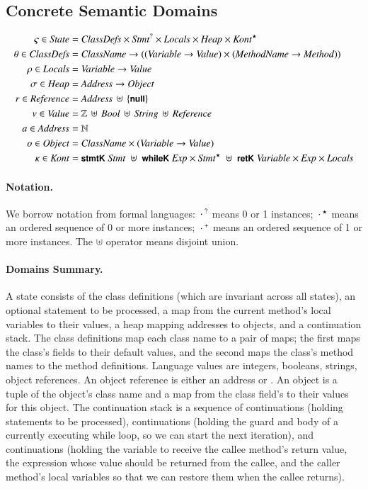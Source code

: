 \documentclass[10pt]{article}
\begin{document}
\subsection{Concrete Semantic Domains}
\label{ssec:cdomains}

\begin{align*}
  \varsigma \in \mathit{State} &= \mathit{ClassDefs} \times \mathit{Stmt}^? \times \mathit{Locals} \times
  \mathit{Heap} \times \mathit{Kont}^\star
  \\
  \theta \in \mathit{ClassDefs} &= \mathit{ClassName} \to ((\mathit{Variable} \to \mathit{Value}) \times
  (\mathit{MethodName} \to \mathit{Method}))
  \\
  \rho \in \mathit{Locals} &= \mathit{Variable} \to \mathit{Value}
  \\
  \sigma \in \mathit{Heap} &= \mathit{Address} \to \mathit{Object}
  \\
  r \in \mathit{Reference} &= \mathit{Address} \,\uplus\, \left\{\mbox{\sffamily{\bfseries\small {null}}}\right\}
  \\
  v \in \mathit{Value} &= \mathbb{Z} \,\uplus\, \mathit{Bool} \,\uplus\, \mathit{String} \,\uplus\,
  \mathit{Reference}
  \\
  a \in \mathit{Address} &= \mathbb{N}
  \\
  o \in \mathit{Object} &= \mathit{ClassName} \times (\mathit{Variable} \to \mathit{Value})
  \\
  \kappa \in \mathit{Kont} &= \mbox{\sffamily{\bfseries\small {stmtK}}}\;\mathit{Stmt} \;\uplus\; \mbox{\sffamily{\bfseries\small {whileK}}}\;\mathit{Exp} \times \mathit{Stmt}^\star
  \;\uplus\; \mbox{\sffamily{\bfseries\small {retK}}}\;\mathit{Variable} \times \mathit{Exp} \times \mathit{Locals}
\end{align*}

\paragraph{Notation.} We borrow notation from formal languages:
$\,\cdot\,^?$ means 0 or 1 instances; $\,\cdot\,^\star$ means an ordered
sequence of 0 or more instances; $\,\cdot\,^+$ means an ordered sequence
of 1 or more instances. The $\uplus$ operator means disjoint union.

\paragraph{Domains Summary.} A state consists of the class definitions
(which are invariant across all states), an optional statement to be
processed, a map from the current method's local variables to their
values, a heap mapping addresses to objects, and a continuation
stack. The class definitions map each class name to a pair of maps;
the first maps the class's fields to their default values, and the
second maps the class's method names to the method
definitions. Language values are integers, booleans, strings, object
references. An object reference is either an address or . An
object is a tuple of the object's class name and a map from the class
field's to their values for this object. The continuation stack is a
sequence of  continuations (holding statements to be
processed),  continuations (holding the guard and body of a
currently executing while loop, so we can start the next iteration),
and  continuations (holding the variable to receive the
callee method's return value, the expression whose value should be
returned from the callee, and the caller method's local variables so
that we can restore them when the callee returns).
\end{document}
